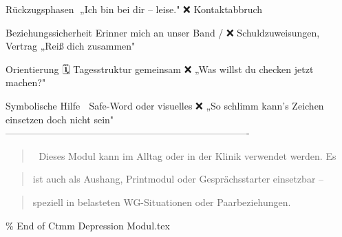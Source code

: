 Rückzugsphasen         🧍„Ich bin bei dir -- leise."   ❌ Kontaktabbruch

Beziehungssicherheit   \textcolor{ctmmPurple}{} Erinner mich an unser Band / ❌ Schuldzuweisungen,
Vertrag                         „Reiß dich zusammen"

Orientierung           🗓️ Tagesstruktur gemeinsam      ❌ „Was willst du
checken                         jetzt machen?"

Symbolische Hilfe      🔗 Safe-Word oder visuelles     ❌ „So schlimm kann's
Zeichen einsetzen               doch nicht sein"
----------------------------------------------------------------------------

\begin{quote}
📎 Dieses Modul kann im Alltag oder in der Klinik verwendet werden. Es
\end{quote}
\begin{quote}
ist auch als Aushang, Printmodul oder Gesprächsstarter einsetzbar --
\end{quote}
\begin{quote}
speziell in belasteten WG-Situationen oder Paarbeziehungen.
\end{quote}

\% End of Ctmm Depression Modul.tex
